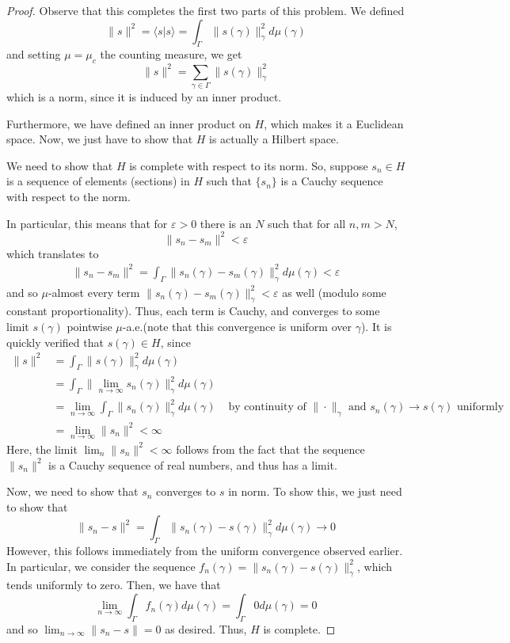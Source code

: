 \documentclass[fontsize=11pt]{scrartcl} %
\numberwithin{equation}{section} %
\numberwithin{figure}{section} %
\numberwithin{table}{section} %
\newcommand{\la}{\langle}
\newcommand{\ra}{\rangle}
\begin{document}
\begin{proof}
    Observe that this completes the first two parts of this problem. We defined
    \[
        \|s\|^2 = \la s|s\ra = \int_{\Gamma}\|s(\gamma)\|_{\gamma}^2
        d\mu(\gamma)
    \]
    and setting $\mu = \mu_c$ the counting measure, we get
    \[
        \|s\|^2 = \sum_{\gamma\in\Gamma}\|s(\gamma)\|_{\gamma}^2
    \]
    which is a norm, since it is induced by an inner product.

    Furthermore, we have defined an inner product on $H$, which makes it a
    Euclidean space. Now, we just have to show that $H$ is actually a Hilbert
    space.


    We need to show that $H$ is complete with respect to its norm. So, suppose
    $s_n\in H$ is a sequence of elements (sections) in $H$ such that $\{s_n\}$
    is a Cauchy sequence with respect to the norm.

    In particular, this means that for $\varepsilon>0$ there is an $N$ such that
    for all $n,m>N$,
    \[
        \|s_n-s_m\|^2 < \varepsilon
    \]
    which translates to
    \[
        \begin{aligned}
            \|s_n-s_m\|^2 = \int_{\Gamma}\|s_n(\gamma) - s_m(\gamma)\|_{\gamma}^2
            d\mu(\gamma) <
            \varepsilon
    \end{aligned}
    \]
    and so $\mu$-almost every term $\|s_n(\gamma)-s_m(\gamma)\|_{\gamma}^2 <
    \varepsilon$ as well (modulo some constant proportionality). Thus, each term
    is Cauchy, and converges to some limit $s(\gamma)$ pointwise $\mu$-a.e.(note
    that this convergence is uniform over $\gamma$). It is quickly verified that
    $s(\gamma)\in H$, since
    \[
        \begin{aligned}
        \|s\|^2 &= \int_{\Gamma}\|s(\gamma)\|_{\gamma}^2d\mu(\gamma)\\
        &=
        \int_{\Gamma}\|\lim_{n\to\infty}s_n(\gamma)\|_{\gamma}^2d\mu(\gamma)\\
        &= \lim_{n\to\infty}\int_{\Gamma}\|s_n(\gamma)\|_{\gamma}^2
        d\mu(\gamma) &\text{ by continuity of $\|\cdot\|_{\gamma}$ and
        $s_n(\gamma)\to s(\gamma)$ uniformly}\\
        &= \lim_{n\to\infty}\|s_n\|^2 < \infty
        \end{aligned}
    \]
    Here, the limit $\lim_n\|s_n\|^2 <\infty$ follows from the fact that the
    sequence $\|s_n\|^2$ is a Cauchy sequence of real numbers, and thus has a
    limit.

    Now, we need to show that $s_n$ converges to $s$ in norm.
    To show this, we just need to show that
    \[
        \|s_n-s\|^2 = \int_{\Gamma}\|s_n(\gamma)- s(\gamma)\|^2_{\gamma}d\mu(\gamma)
        \to 0
    \]
    However, this follows immediately from the uniform convergence observed
    earlier. In particular, we consider the sequence $f_n(\gamma) =
    \|s_n(\gamma) - s(\gamma)\|^2_{\gamma}$, which tends uniformly to zero.
    Then, we have that
    \[
        \lim_{n\to\infty}\int_{\Gamma}f_n(\gamma)d\mu(\gamma) =
        \int_{\Gamma}0d\mu(\gamma) = 0
    \]
    and so $\lim_{n\to\infty}\|s_n-s\| = 0$ as desired. Thus, $H$ is complete.



\end{proof}
\end{document}
